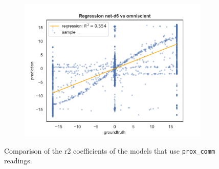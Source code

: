 \begin{figure}[!htb]
\begin{center}
\begin{subfigure}[h]{0.49\textwidth}
		\end{subfigure}
	\end{center}
	\begin{center}
		\begin{subfigure}[h]{0.49\textwidth}
			\includegraphics[width=\textwidth]{contents/images/net-d6/regression-net-d6-vs-omniscient}
		\end{subfigure}
	\end{center}
	\caption[Comparison of the \gls{r2} coefficients for \texttt{prox\_comm} 
	readings.]{Comparison of the \gls{r2} coefficients of the models that use 
	\texttt{prox\_comm} readings.}
	\label{fig:net-d456r2}
\end{figure}

